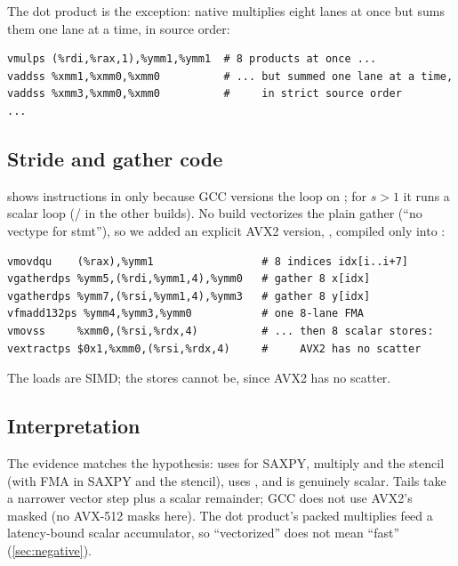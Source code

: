 The dot product is the exception: native multiplies eight lanes at once but sums them one lane at
a time, in source order:
\begin{lstlisting}[style=excerpt]
vmulps (%rdi,%rax,1),%ymm1,%ymm1  # 8 products at once ...
vaddss %xmm1,%xmm0,%xmm0          # ... but summed one lane at a time,
vaddss %xmm3,%xmm0,%xmm0          #     in strict source order
...
\end{lstlisting}

\subsection{Stride and gather code}
 shows  instructions in  only because GCC versions
the loop on ; for $s>1$ it runs a scalar  loop (/
in the other builds). No build vectorizes the plain gather (\enquote{no vectype for stmt}), so we
added an explicit AVX2 version, , compiled only into :
\begin{lstlisting}[style=excerpt]
vmovdqu    (%rax),%ymm1                 # 8 indices idx[i..i+7]
vgatherdps %ymm5,(%rdi,%ymm1,4),%ymm0   # gather 8 x[idx]
vgatherdps %ymm7,(%rsi,%ymm1,4),%ymm3   # gather 8 y[idx]
vfmadd132ps %ymm4,%ymm3,%ymm0           # one 8-lane FMA
vmovss     %xmm0,(%rsi,%rdx,4)          # ... then 8 scalar stores:
vextractps $0x1,%xmm0,(%rsi,%rdx,4)     #     AVX2 has no scatter
\end{lstlisting}
The loads are SIMD; the stores cannot be, since AVX2 has no scatter.

\subsection{Interpretation}
The evidence matches the hypothesis:  uses  for SAXPY, multiply and the
stencil (with FMA in SAXPY and the stencil),  uses , and  is
genuinely scalar. Tails take a narrower vector step plus a scalar remainder; GCC does not use AVX2's
masked  (no AVX-512 masks here). The dot product's packed multiplies feed a
latency-bound scalar accumulator, so ``vectorized'' does not mean ``fast'' (\cref{sec:negative}).
